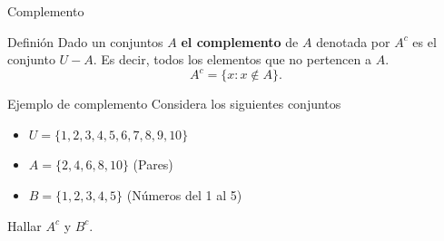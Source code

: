 \documentclass[aspectratio=169]{beamer}
\begin{document}
\begin{frame}[t]{Complemento} 
\begin{block}{Definión}
Dado un conjuntos $A$ \textbf{el complemento} de $A$ denotada por $A^c$ es el conjunto $U-A$. Es decir, todos los elementos que no pertencen a $A$.
$$A^c = \{x: x\notin A\}.$$
    
\end{block}
\end{frame}

\begin{frame}[t]{Ejemplo de complemento} 
\Large
Considera los siguientes conjuntos
\begin{itemize}
    \item $U=\{1,2,3,4,5,6,7,8,9,10\}$
    \item $A=\{2,4,6,8,10\}$ (Pares)
    \item $B=\{1,2,3,4,5\} $ (Números del 1 al 5)
\end{itemize}
Hallar $A^c$ y $B^c$.
\end{frame}
\end{document}
